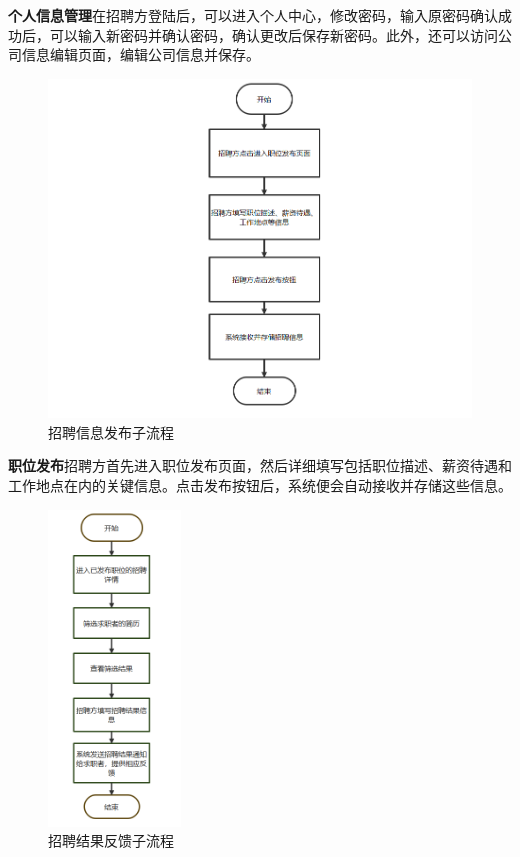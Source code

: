 \documentclass[UTF8,a4paper,10pt]{ctexart}
\begin{document}
\textbf{个人信息管理}\space 在招聘方登陆后，可以进入个人中心，修改密码，输入原密码确认成功后，可以输入新密码并确认密码，确认更改后保存新密码。此外，还可以访问公司信息编辑页面，编辑公司信息并保存。

\begin{figure}[H]
    \centering
    \includegraphics[width=\textwidth]{img/招聘信息发布子流程.png}
    \caption{招聘信息发布子流程}
    \label{fig:招聘信息发布子流程}
\end{figure}

\textbf{职位发布}\space 招聘方首先进入职位发布页面，然后详细填写包括职位描述、薪资待遇和工作地点在内的关键信息。点击发布按钮后，系统便会自动接收并存储这些信息。

\begin{figure}[H]
    \centering
    \includegraphics[width=100pt]{img/招聘结果反馈子流程.png}
    \caption{招聘结果反馈子流程}
    \label{fig:招聘结果反馈子流程}
\end{figure}
\end{document}
